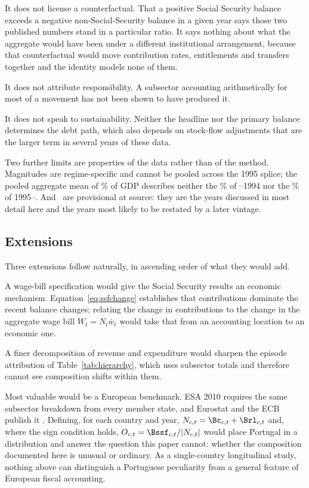 It does not license a counterfactual. That a positive Social Security balance exceeds
a negative non-Social-Security balance in a given year says those two published
numbers stand in a particular ratio. It says nothing about what the aggregate would
have been under a different institutional arrangement, because that counterfactual
would move contribution rates, entitlements and transfers together and the identity
models none of them.

It does not attribute responsibility. A subsector accounting arithmetically for most
of a movement has not been shown to have produced it.

It does not speak to sustainability. Neither the headline nor the primary balance
determines the debt path, which also depends on stock-flow adjustments that are the
larger term in several years of these data.

Two further limits are properties of the data rather than of the method. Magnitudes
are regime-specific and cannot be pooled across the 1995 splice; the pooled aggregate
mean of \GgMeanPooled\% of GDP describes neither the \GgMeanHistorical\% of
\PanelStart--1994 nor the \GgMeanModern\% of 1995--\PanelEnd. And
\ProvisionalYears\ are provisional at source: they are the years discussed in most
detail here and the years most likely to be restated by a later vintage.

\subsection{Extensions}

Three extensions follow naturally, in ascending order of what they would add.

A wage-bill specification would give the Social Security results an economic
mechanism. Equation~\eqref{eq:ssfchange} establishes that contributions dominate the
recent balance changes; relating the change in contributions to the change in the
aggregate wage bill $W_t = N_t \bar{w}_t$ would take that from an accounting location
to an economic one.

A finer decomposition of revenue and expenditure would sharpen the episode attribution
of Table~\ref{tab:hierarchy}, which uses subsector totals and therefore cannot see
composition shifts within them.

Most valuable would be a European benchmark. ESA 2010 requires the same subsector
breakdown from every member state, and Eurostat and the ECB publish it
\citep{eurostat_gov_main,ecb_gfs}. Defining, for each country and year,
$N_{c,t} = \Bc_{c,t} + \Brl_{c,t}$ and, where the sign condition holds,
$O_{c,t} = \Bssf_{c,t}/|N_{c,t}|$ would place Portugal in a distribution and answer
the question this paper cannot: whether the composition documented here is unusual
or ordinary. As a single-country longitudinal study, nothing above can distinguish a
Portuguese peculiarity from a general feature of European fiscal accounting.

